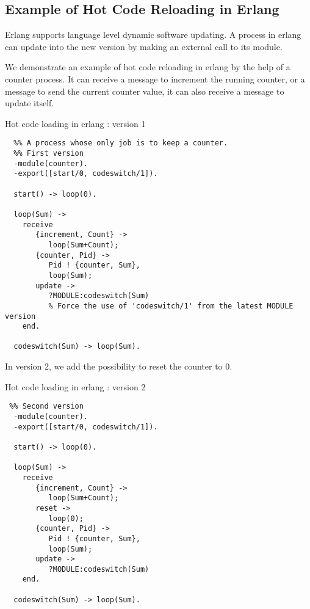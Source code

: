 \subsection{Example of Hot Code Reloading in Erlang}

Erlang supports language level dynamic software updating. A process in
erlang can update into the new version by making an external call to
its module.

We demonstrate an example of hot code reloading in erlang by the help
of a counter process. It can receive a message to increment the
running counter, or a message to send the current counter value, it
can also receive a message to update itself.

\begin{program}
\caption[An example of hot code loading]
{Hot code loading in erlang : version 1}
\label{fig:erlang-v1}

\begin{verbatim}
  %% A process whose only job is to keep a counter.
  %% First version
  -module(counter).
  -export([start/0, codeswitch/1]).

  start() -> loop(0).

  loop(Sum) ->
    receive
       {increment, Count} ->
          loop(Sum+Count);
       {counter, Pid} ->
          Pid ! {counter, Sum},
          loop(Sum);
       update ->
          ?MODULE:codeswitch(Sum)
          % Force the use of 'codeswitch/1' from the latest MODULE version
    end.

  codeswitch(Sum) -> loop(Sum).
\end{verbatim}
\end{program}

In version 2, we add the possibility to reset the counter to 0.

\begin{program}
\caption[An example of hot code loading]
{Hot code loading in erlang : version 2}
\label{fig:erlang-v2}

\begin{verbatim}
 %% Second version
  -module(counter).
  -export([start/0, codeswitch/1]).

  start() -> loop(0).

  loop(Sum) ->
    receive
       {increment, Count} ->
          loop(Sum+Count);
       reset ->
          loop(0);
       {counter, Pid} ->
          Pid ! {counter, Sum},
          loop(Sum);
       update ->
          ?MODULE:codeswitch(Sum)
    end.

  codeswitch(Sum) -> loop(Sum).
\end{verbatim}
\end{program}

